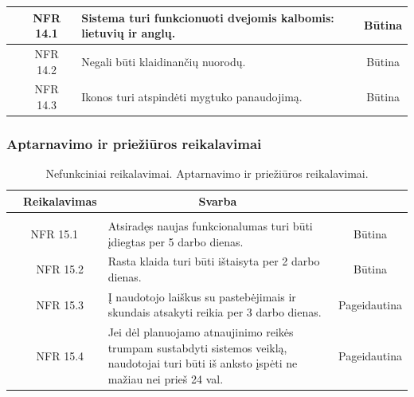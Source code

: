 \documentclass{VUMIFPSkursinis}
\begin{document}
\begin{table}[H]
\begin{tabular}{|p{1cm}|p{1cm}|p{}|p{}|}
		\hline
		\multicolumn{1}{|c}{}&
		\multicolumn{1}{c|}{NFR 14.1}&
		{Sistema turi funkcionuoti dvejomis kalbomis: lietuvių ir anglų.}&
		\multicolumn{1}{c|}{Būtina}\\
		
		\hline
		\multicolumn{1}{|c}{}&
		\multicolumn{1}{c|}{NFR 14.2}&
		{Negali būti klaidinančių nuorodų.}&
		\multicolumn{1}{c|}{Būtina}\\
		
		\hline
		\multicolumn{1}{|c}{}&
		\multicolumn{1}{c|}{NFR 14.3}&
		{Ikonos turi atspindėti mygtuko panaudojimą.}&
		\multicolumn{1}{c|}{Būtina}\\
		
		\hline
	\end{tabular}		
\end{table}
\subsubsection{Aptarnavimo ir priežiūros reikalavimai}
\begin{table}[H]
	\caption{Nefunkciniai reikalavimai. Aptarnavimo ir priežiūros reikalavimai.}
	\begin{tabular}{|p{1cm}|p{1cm}|p{}|p{}|}
		\hline 
		\rowcolor{gray!50}
		\multicolumn{2}{|c|}{{\bfseries Kodas}}&
		\multicolumn{1}{c|}{{\bfseries Reikalavimas}}&
		\multicolumn{1}{c|}{{\bfseries Svarba}}\\
		\hline
		\rowcolor{lightgray}
		\multicolumn{4}{|c|}{Aptarnavimo ir priežiūros reikalavimai}\\		
		
		\hline
		\multicolumn{2}{|c|}{NFR 15.1}&
		{Atsiradęs naujas funkcionalumas turi būti įdiegtas per 5 darbo dienas.
		}&		
		\multicolumn{1}{c|}{Būtina}\\
		\hline
		\multicolumn{1}{|c}{}&
		\multicolumn{1}{c|}{NFR 15.2}&
		{Rasta klaida turi būti ištaisyta per 2 darbo dienas.
		}&		
		\multicolumn{1}{c|}{Būtina}\\
		
		\hline
		\multicolumn{1}{|c}{}&
		\multicolumn{1}{c|}{NFR 15.3}&
		{Į naudotojo laiškus su pastebėjimais ir skundais atsakyti reikia per 3 darbo dienas.
		}&		
		\multicolumn{1}{c|}{Pageidautina}\\
		
		\hline
		\multicolumn{1}{|c}{}&
		\multicolumn{1}{c|}{NFR 15.4}&
		{Jei dėl planuojamo atnaujinimo reikės trumpam sustabdyti
			sistemos veiklą, naudotojai turi būti iš anksto įspėti ne mažiau nei prieš 24 val.
		}&		
		\multicolumn{1}{c|}{Pageidautina}\\	
		
		\hline
	\end{tabular}		
\end{table}
\end{document}
